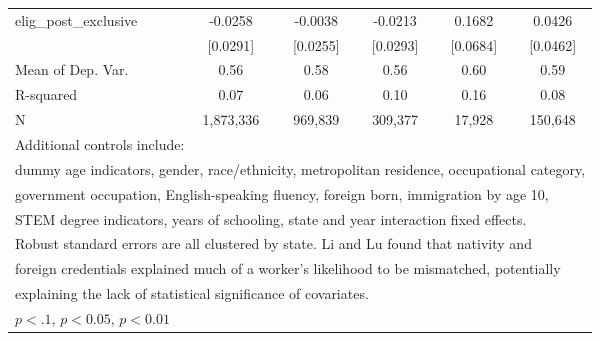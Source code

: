 \begin{table}[htbp]
\begin{tabular}{l*{5}{c}}
\addlinespace
elig\_post\_exclusive &     -0.0258         &     -0.0038         &     -0.0213         &      0.1682\sym{**} &      0.0426         \\
                    &    [0.0291]         &    [0.0255]         &    [0.0293]         &    [0.0684]         &    [0.0462]         \\
\midrule
Mean of Dep. Var.   &        0.56         &        0.58         &        0.56         &        0.60         &        0.59         \\
R-squared           &        0.07         &        0.06         &        0.10         &        0.16         &        0.08         \\
N                   &   1,873,336         &     969,839         &     309,377         &      17,928         &     150,648         \\
\bottomrule
\multicolumn{6}{l}{\footnotesize Additional controls include:}\\
\multicolumn{6}{l}{\footnotesize dummy age indicators, gender, race/ethnicity, metropolitan residence, occupational category,}\\
\multicolumn{6}{l}{\footnotesize government occupation, English-speaking fluency, foreign born, immigration by age 10,}\\
\multicolumn{6}{l}{\footnotesize STEM degree indicators, years of schooling, state and year interaction fixed effects.}\\
\multicolumn{6}{l}{\footnotesize Robust standard errors are all clustered by state. Li and Lu found that nativity and}\\
\multicolumn{6}{l}{\footnotesize foreign credentials explained much of a worker's likelihood to be mismatched, potentially}\\
\multicolumn{6}{l}{\footnotesize explaining the lack of statistical significance of covariates.}\\
\multicolumn{6}{l}{\footnotesize \sym{*} \(p<.1\), \sym{**} \(p<0.05\), \sym{***} \(p<0.01\)}\\
\end{tabular}
\end{table}
